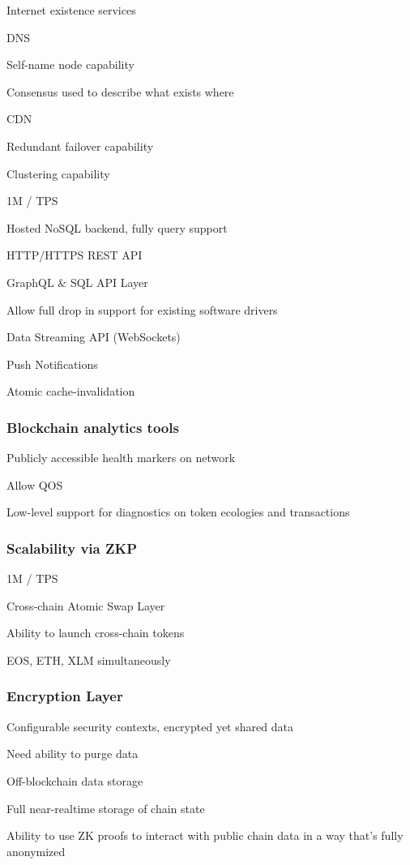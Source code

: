 \documentclass[11pt]{article}
\begin{document}
Internet existence services


DNS


Self-name node capability


Consensus used to describe what exists where


CDN


Redundant failover capability


Clustering capability


1M / TPS


Hosted NoSQL backend, fully query support


HTTP/HTTPS REST API


GraphQL \& SQL API Layer


Allow full drop in support for existing software drivers


Data Streaming API (WebSockets)


Push Notifications


Atomic cache-invalidation


\subsubsection{Blockchain analytics tools}

Publicly accessible health markers on network


Allow QOS


Low-level support for diagnostics on token ecologies and transactions


\subsubsection{Scalability via ZKP}

1M / TPS


Cross-chain Atomic Swap Layer


Ability to launch cross-chain tokens


EOS, ETH, XLM simultaneously


\subsubsection{Encryption Layer}

Configurable security contexts, encrypted yet shared data


Need ability to purge data


Off-blockchain data storage


Full near-realtime storage of chain state


Ability to use ZK proofs to interact with public chain data in a way that's fully anonymized
\end{document}
